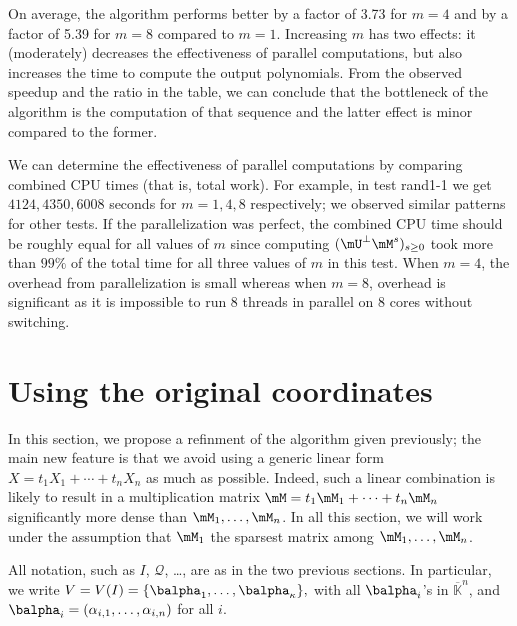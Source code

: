 \documentclass[12pt]{article}
\newcommand{\lf}{X}
\newcommand{\residueI}{\mathscr{Q}}
\def\dg{\kappa}
\def\Kbar {{\ensuremath{\overline{\mathbb{K}}}}}
\begin{document}
On average, the algorithm performs better by a factor of 3.73 for
$m=4$ and by a factor of 5.39 for $m=8$ compared to $m=1$. Increasing
$m$ has two effects: it (moderately) decreases the effectiveness of
parallel computations, but also increases the time to compute the
output polynomials. From the observed speedup and the ratio in the
table, we can conclude that the bottleneck of the algorithm is
the computation of that sequence and the latter effect is minor
compared to the former.

We can determine the effectiveness of parallel computations by
comparing combined CPU times (that is, total work).  For example, in
test rand1-1 we get $4124, 4350, 6008$ seconds for $m=1,4,8$
respectively; we observed similar patterns for other tests. If the
parallelization was perfect, the combined CPU time should be roughly
equal for all values of $m$ since computing $(\mU^{\perp}
\mM^s)_{s\ge0}$ took more than $99\%$ of the total time for all three
values of $m$ in this test. When $m=4$, the overhead from
parallelization is small whereas when $m=8$, overhead is significant
as it is impossible to run 8 threads in parallel on 8 cores without
switching.


\section{Using the original coordinates}

In this section, we propose a refinment of the algorithm given
previously; the main new feature is that we avoid using a generic
linear form $\lf = t_1 X_1 + \cdots + t_n X_n$ as much as possible.
Indeed, such a linear combination is likely to result in a
multiplication matrix $\mM = t_1 \mM_1 + \cdots + t_n \mM_n$
significantly more dense than $\mM_1,\dots,\mM_n$. In all this
section, we will work under the assumption that $\mM_1$ the sparsest
matrix among $\mM_1,\dots,\mM_n$.

All notation, such as $I$, $\residueI$, \dots, are as in the two previous
sections.  In particular, we write
$V=V(I)=\{\balpha_1,\dots,\balpha_\dg\},$ with all $\balpha_i$'s in
$\Kbar^n$, and $\balpha_i=(\alpha_{i,1},\dots,\alpha_{i,n})$ for all
$i$.

\end{document}
